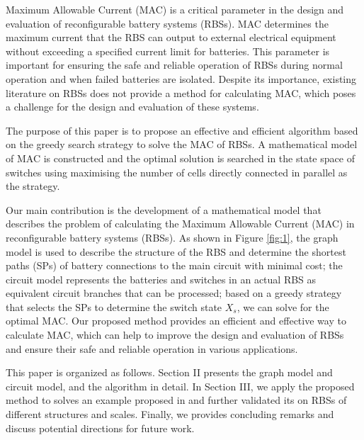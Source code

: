 \documentclass{article}
\begin{document}
Maximum Allowable Current (MAC) is a critical parameter in the design and evaluation of reconfigurable battery systems (RBSs).
MAC determines the maximum current that the RBS can output to external electrical equipment without exceeding a specified current limit for batteries.
This parameter is important for ensuring the safe and reliable operation of RBSs during normal operation and when failed batteries are isolated.
Despite its importance, existing literature on RBSs does not provide a method for calculating MAC, which poses a challenge for the design and evaluation of these systems.


The purpose of this paper is to propose an effective and efficient algorithm based on the greedy search strategy to solve the MAC of RBSs.
A mathematical model of MAC is constructed and the optimal solution is searched in the state space of switches using maximising the number of cells directly connected in parallel as the strategy.

Our main contribution is the development of a mathematical model that describes the problem of calculating the Maximum Allowable Current (MAC) in reconfigurable battery systems (RBSs).
As shown in Figure \ref{fig:1}, the graph model is used to describe the structure of the RBS and determine the shortest paths (SPs) of battery connections to the main circuit with minimal cost;
the circuit model represents the batteries and switches in an actual RBS as equivalent circuit branches that can be processed;
based on a greedy strategy that selects the SPs to determine the switch state $X_s$, we can solve for the optimal MAC.
Our proposed method provides an efficient and effective way to calculate MAC, which can help to improve the design and evaluation of RBSs and ensure their safe and reliable operation in various applications.


This paper is organized as follows.
Section II presents the graph model and circuit model, and the algorithm in detail.
In Section III, we apply the proposed method to solves an example proposed in \cite{kimDESADependableEfficient2012} and further validated its on RBSs of different structures and scales.
Finally, we provides concluding remarks and discuss potential directions for future work.
\end{document}
